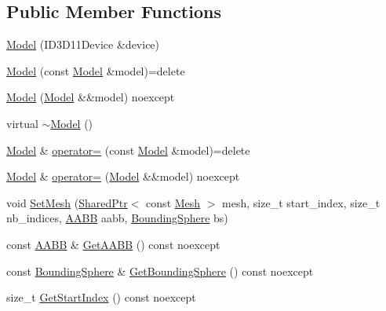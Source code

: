 \subsection*{Public Member Functions}
\begin{DoxyCompactItemize}
\item 
\hyperlink{classmage_1_1rendering_1_1_model_a7f135a6ed7604655e94d3264bd9d5c62}{Model} (I\+D3\+D11\+Device \&device)
\item 
\hyperlink{classmage_1_1rendering_1_1_model_a59a64dc710efaa44b9f256883d0ab9cb}{Model} (const \hyperlink{classmage_1_1rendering_1_1_model}{Model} \&model)=delete
\item 
\hyperlink{classmage_1_1rendering_1_1_model_a550ece2d159145d9e9549e48235d1ca1}{Model} (\hyperlink{classmage_1_1rendering_1_1_model}{Model} \&\&model) noexcept
\item 
virtual \hyperlink{classmage_1_1rendering_1_1_model_a8fd12c516788a98ce5109aee41d834b8}{$\sim$\+Model} ()
\item 
\hyperlink{classmage_1_1rendering_1_1_model}{Model} \& \hyperlink{classmage_1_1rendering_1_1_model_aa7edda6386fa2ae0638e5c46dccff016}{operator=} (const \hyperlink{classmage_1_1rendering_1_1_model}{Model} \&model)=delete
\item 
\hyperlink{classmage_1_1rendering_1_1_model}{Model} \& \hyperlink{classmage_1_1rendering_1_1_model_a2b374cb908e39da8ff35ea5c17ce640d}{operator=} (\hyperlink{classmage_1_1rendering_1_1_model}{Model} \&\&model) noexcept
\item 
void \hyperlink{classmage_1_1rendering_1_1_model_abb5ea57049494e271bcd5b05842d4f8e}{Set\+Mesh} (\hyperlink{namespacemage_a1e01ae66713838a7a67d30e44c67703e}{Shared\+Ptr}$<$ const \hyperlink{classmage_1_1rendering_1_1_mesh}{Mesh} $>$ mesh, size\+\_\+t start\+\_\+index, size\+\_\+t nb\+\_\+indices, \hyperlink{classmage_1_1_a_a_b_b}{A\+A\+BB} aabb, \hyperlink{classmage_1_1_bounding_sphere}{Bounding\+Sphere} bs)
\item 
const \hyperlink{classmage_1_1_a_a_b_b}{A\+A\+BB} \& \hyperlink{classmage_1_1rendering_1_1_model_a05a767ef1551aa4c09c223d8f2311855}{Get\+A\+A\+BB} () const noexcept
\item 
const \hyperlink{classmage_1_1_bounding_sphere}{Bounding\+Sphere} \& \hyperlink{classmage_1_1rendering_1_1_model_a8885748932b52ec2d5bde368db6a130d}{Get\+Bounding\+Sphere} () const noexcept
\item 
size\+\_\+t \hyperlink{classmage_1_1rendering_1_1_model_a2944b26434496b580bbbebbccd592ee3}{Get\+Start\+Index} () const noexcept

\end{DoxyCompactItemize}
